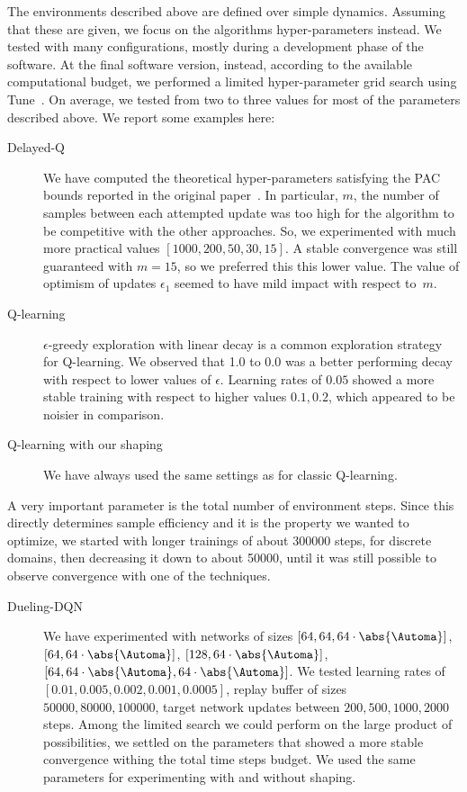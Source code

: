 The environments described above are defined over simple dynamics.
Assuming that these are given, we focus on the algorithms hyper-parameters instead.
We tested with many configurations, mostly during a development phase of the software.
At the final software version, instead, according to the available computational budget, we performed a limited hyper-parameter grid search using Tune~\cite{liaw2018tune}.
On average, we tested from two to three values for most of the parameters described above.
We report some examples here:
\begin{description}
	\item[Delayed-Q]
		We have computed the theoretical hyper-parameters satisfying the PAC bounds reported in the original paper~\cite{strehl2006pac}.
		In particular, $m$, the number of samples between each attempted update was too high for the algorithm to be competitive with the other approaches.
		So, we experimented with much more practical values $[1000, 200, 50, 30, 15]$.
		A stable convergence was still guaranteed with $m = 15$,
		so we preferred this this lower value.
		The value of optimism of updates $\epsilon_1$ seemed to have mild impact with respect to~$m$. 
	\item[Q-learning]
		$\epsilon$-greedy exploration with linear decay is a common exploration strategy for Q-learning.
		We observed that 1.0 to 0.0 was a better performing decay with respect to lower values of $\epsilon$.
		Learning rates of $0.05$ showed a more stable training with respect to higher values $0.1, 0.2$,
		which appeared to be noisier in comparison.
	\item[Q-learning with our shaping]
		We have always used the same settings as for classic Q-learning.
\end{description}
A very important parameter is the total number of environment steps.
Since this directly determines sample efficiency and it is the property we wanted to optimize,
we started with longer trainings of about 300000 steps, for discrete domains, then decreasing it down to about 50000,
until it was still possible to observe convergence with one of the techniques.
\begin{description}
	\item[Dueling-DQN]
		We have experimented with networks of sizes $[64, 64, 64\cdot\abs{\Automa}]$,
		$[64, 64\cdot\abs{\Automa}]$, 
		$[128, 64\cdot\abs{\Automa}]$, 
		$[64, 64\cdot\abs{\Automa}, 64\cdot\abs{\Automa}]$.
		We tested learning rates of $[0.01, 0.005, 0.002, 0.001, 0.0005]$,
		replay buffer of sizes $50000, 80000, 100000$,
		target network updates between $200, 500, 1000, 2000$ steps.
		Among the limited search we could perform on the large product of possibilities,
		we settled on the parameters that showed a more stable convergence withing the
		total time steps budget.
		We used the same parameters for experimenting with and without shaping.
\end{description}


